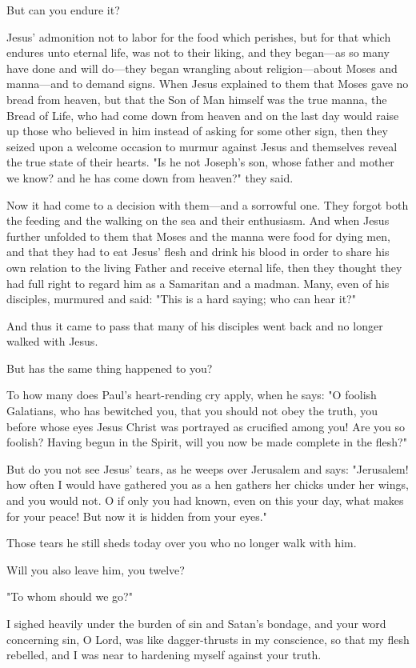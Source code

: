 But can you endure it?

Jesus’ admonition not to labor for the food which perishes, but for that which endures unto eternal life, was not to their liking, and they began—as so many have done and will do—they began wrangling about religion—about Moses and manna—and to demand signs. When Jesus explained to them that Moses gave no bread from heaven, but that the Son of Man himself was the true manna, the Bread of Life, who had come down from heaven and on the last day would raise up those who believed in him instead of asking for some other sign, then they seized upon a welcome occasion to murmur against Jesus and themselves reveal the true state of their hearts. "Is he not Joseph’s son, whose father and mother we know? and he has come down from heaven?" they said.

Now it had come to a decision with them—and a sorrowful one. They forgot both the feeding and the walking on the sea and their enthusiasm. And when Jesus further unfolded to them that Moses and the manna were food for dying men, and that they had to eat Jesus’ flesh and drink his blood in order to share his own relation to the living Father and receive eternal life, then they thought they had full right to regard him as a Samaritan and a madman. Many, even of his disciples, murmured and said: "This is a hard saying; who can hear it?"

And thus it came to pass that many of his disciples went back and no longer walked with Jesus.

But has the same thing happened to you?

To how many does Paul’s heart-rending cry apply, when he says: "O foolish Galatians, who has bewitched you, that you should not obey the truth, you before whose eyes Jesus Christ was portrayed as crucified among you! Are you so foolish? Having begun in the Spirit, will you now be made complete in the flesh?"

But do you not see Jesus’ tears, as he weeps over Jerusalem and says: "Jerusalem! how often I would have gathered you as a hen gathers her chicks under her wings, and you would not. O if only you had known, even on this your day, what makes for your peace! But now it is hidden from your eyes."

Those tears he still sheds today over you who no longer walk with him.

Will you also leave him, you twelve?

"To whom should we go?"

I sighed heavily under the burden of sin and Satan’s bondage, and your word concerning sin, O Lord, was like dagger-thrusts in my conscience, so that my flesh rebelled, and I was near to hardening myself against your truth.

